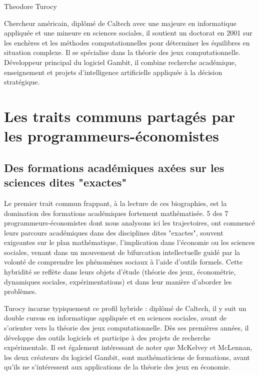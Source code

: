 Theodore Turocy

Chercheur américain, diplômé de Caltech avec une majeure en informatique appliquée et une mineure en sciences sociales, il soutient un doctorat en 2001 sur les enchères et les méthodes computationnelles pour déterminer les équilibres en situation complexe. Il se spécialise dans la théorie des jeux computationnelle. Développeur principal du logiciel Gambit, il combine recherche académique, enseignement et projets d’intelligence artificielle appliquée à la décision stratégique.


\section{Les traits communs partagés par les programmeurs-économistes}



\subsection{Des formations académiques axées sur les sciences dites "exactes"}

Le premier trait commun frappant, à la lecture de ces biographies, est la domination des formations académiques fortement mathématisée.
5 des 7 programmeurs-économistes dont nous analysons ici les trajectoires, ont commencé leurs parcours académiques dans des disciplines dites "exactes", souvent exigeantes sur le plan mathématique, l’implication dans l’économie ou les sciences sociales, venant dans un mouvement de bifurcation intellectuelle guidé par la volonté de comprendre les phénomènes sociaux à l’aide d’outils formels. 
Cette hybridité se reflète dans leurs objets d’étude (théorie des jeux, économétrie, dynamiques sociales, expérimentations) et dans leur manière d’aborder les problèmes. 

Turocy incarne typiquement ce profil hybride : diplômé de Caltech, il y suit un double cursus en informatique appliquée et en sciences sociales, avant de s’orienter vers la théorie des jeux computationnelle. Dès ses premières années, il développe des outils logiciels et participe à des projets de recherche expérimentale. Il est également intéressant de noter que McKelvey et McLennan, les deux créateurs du logiciel Gambit, sont mathématiciens de formations, avant qu'ils ne s'intéressent aux applications de la théorie des jeux en économie.

